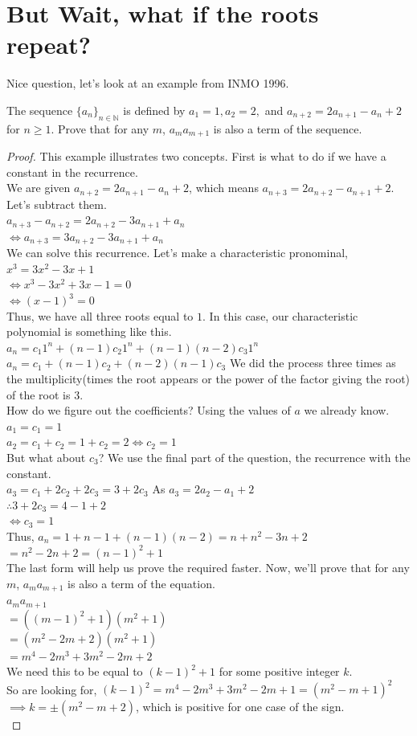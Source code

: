 \section{But Wait, what if the roots repeat?}
Nice question, let's look at an example from INMO 1996.
\begin{example}
The sequence $\{a_n\}_{n\in \mathbb{N}}$ is defined by $a_1=1, a_2=2,$ and $a_{n+2}=2a_{n+1}-a_n+2$ for $n \geq 1$.
Prove that for any $m$, $a_m a_{m+1}$ is also a term of the sequence.
\end{example}
\begin{proof}
    This example illustrates two concepts. First is what to do if we have a constant in the recurrence.\\
  We are given  $a_{n+2}=2a_{n+1}-a_n+2$, which means $a_{n+3}=2a_{n+2}-a_{n+1}+2$. Let's subtract them.\\
  $a_{n+3}-a_{n+2}=2a_{n+2}-3a_{n+1}+a_n$\\
  $\iff a_{n+3}=3a_{n+2}-3a_{n+1}+a_n$\\
  We can solve this recurrence. Let's make a characteristic pronominal,\\
  $x^3=3x^2-3x+1$\\
  $\iff x^3-3x^2+3x-1=0$\\
  $\iff (x-1)^3=0$\\
  Thus, we have all three roots equal to $1$. In this case, our characteristic polynomial is something like this.\\
  $a_n=c_1 1^n+(n-1)c_2 1^n+(n-1)(n-2)c_3 1^n$\\
$a_n=c_1+(n-1)c_2+(n-2)(n-1)c_3$
We did the process three times as the multiplicity(times the root appears or the power of the factor giving the root) of the root is $3$.\\
How do we figure out the coefficients? Using the values of $a$ we already know.\\
$a_1=c_1=1$\\
$a_2=c_1+c_2=1+c_2=2 \iff c_2=1$\\
But what about $c_3$? We use the final part of the question, the recurrence with the constant.\\
$a_3=c_1+2c_2+2c_3=3+2c_3$
As $a_3=2a_2-a_1+2$\\
$\therefore 3+2c_3=4-1+2$\\
$\iff c_3=1$\\
Thus, $a_n=1+n-1+(n-1)(n-2)=n+n^2-3n+2$\\
$=n^2-2n+2=(n-1)^2+1$\\
The last form will help us prove the required faster.
Now, we'll prove that for any $m$, $a_m a_{m+1}$ is also a term of the equation.\\
$a_m a_{m+1}$\\
$= ((m-1)^2+1)(m^2+1)$\\
$=(m^2-2m+2)(m^2+1)$\\
$=m^4-2m^3+3m^2-2m+2$\\
We need this to be equal to $(k-1)^2+1$ for some positive integer $k$.\\
So are looking for, $(k-1)^2=m^4-2m^3+3m^2-2m+1=(m^2-m+1)^2$\\
$\implies k=\pm (m^2-m+2)$, which is positive for one case of the sign.\\
\end{proof}
